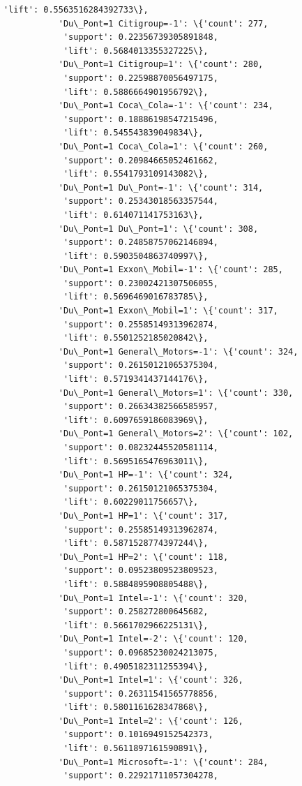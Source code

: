 \documentclass[11pt]{article}
\begin{document}
\begin{Verbatim}[commandchars=\\\{\}]
            'lift': 0.5563516284392733\},
           'Du\_Pont=1 Citigroup=-1': \{'count': 277,
            'support': 0.22356739305891848,
            'lift': 0.5684013355327225\},
           'Du\_Pont=1 Citigroup=1': \{'count': 280,
            'support': 0.22598870056497175,
            'lift': 0.5886664901956792\},
           'Du\_Pont=1 Coca\_Cola=-1': \{'count': 234,
            'support': 0.18886198547215496,
            'lift': 0.545543839049834\},
           'Du\_Pont=1 Coca\_Cola=1': \{'count': 260,
            'support': 0.20984665052461662,
            'lift': 0.5541793109143082\},
           'Du\_Pont=1 Du\_Pont=-1': \{'count': 314,
            'support': 0.25343018563357544,
            'lift': 0.614071141753163\},
           'Du\_Pont=1 Du\_Pont=1': \{'count': 308,
            'support': 0.24858757062146894,
            'lift': 0.5903504863740997\},
           'Du\_Pont=1 Exxon\_Mobil=-1': \{'count': 285,
            'support': 0.23002421307506055,
            'lift': 0.5696469016783785\},
           'Du\_Pont=1 Exxon\_Mobil=1': \{'count': 317,
            'support': 0.25585149313962874,
            'lift': 0.5501252185020842\},
           'Du\_Pont=1 General\_Motors=-1': \{'count': 324,
            'support': 0.26150121065375304,
            'lift': 0.5719341437144176\},
           'Du\_Pont=1 General\_Motors=1': \{'count': 330,
            'support': 0.26634382566585957,
            'lift': 0.6097659186083969\},
           'Du\_Pont=1 General\_Motors=2': \{'count': 102,
            'support': 0.08232445520581114,
            'lift': 0.5695165476963011\},
           'Du\_Pont=1 HP=-1': \{'count': 324,
            'support': 0.26150121065375304,
            'lift': 0.60229011756657\},
           'Du\_Pont=1 HP=1': \{'count': 317,
            'support': 0.25585149313962874,
            'lift': 0.5871528774397244\},
           'Du\_Pont=1 HP=2': \{'count': 118,
            'support': 0.09523809523809523,
            'lift': 0.5884895908805488\},
           'Du\_Pont=1 Intel=-1': \{'count': 320,
            'support': 0.258272800645682,
            'lift': 0.5661702966225131\},
           'Du\_Pont=1 Intel=-2': \{'count': 120,
            'support': 0.09685230024213075,
            'lift': 0.4905182311255394\},
           'Du\_Pont=1 Intel=1': \{'count': 326,
            'support': 0.26311541565778856,
            'lift': 0.5801161628347868\},
           'Du\_Pont=1 Intel=2': \{'count': 126,
            'support': 0.1016949152542373,
            'lift': 0.5611897161590891\},
           'Du\_Pont=1 Microsoft=-1': \{'count': 284,
            'support': 0.22921711057304278,

\end{Verbatim}
\end{document}
